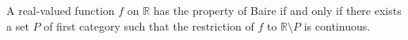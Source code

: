A real-valued function $f$ on $\mathbb{R}$ has the property of Baire if and only if there exists a set $P$ of first category such that the restriction of $f$ to $\mathbb{R} \setminus P$ is continuous.
